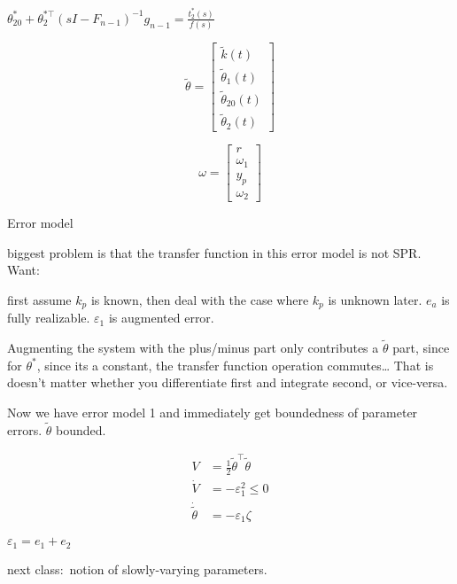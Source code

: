 $\theta_{20}^{*}+\theta_{2}^{*\top}(sI-F_{n-1})^{-1}g_{n-1}=\frac{t_{2}^{*}(s)}{f(s)}$

\begin{equation*}
  \tilde{\theta}=
  \begin{bmatrix}
    \tilde{k}(t) \\
    \tilde{\theta}_{1}(t) \\
    \tilde{\theta}_{20}(t) \\
    \tilde{\theta}_{2}(t)
  \end{bmatrix}
\end{equation*}

\begin{equation*}
  \omega=
  \begin{bmatrix}
    r \\
    \omega_{1} \\
    y_{p} \\
    \omega_{2}
  \end{bmatrix}
\end{equation*}

Error model


biggest problem is that the transfer function in this error model is not SPR.\@
Want:


first assume $k_{p}$ is known, then deal with the case where $k_{p}$ is unknown later.
$e_{a}$ is fully realizable.
$\varepsilon_{1}$ is augmented error.

Augmenting the system with the plus/minus part only contributes a $\tilde{\theta}$ part, since for $\theta^{*}$, since its a constant, the transfer function operation commutes\ldots
That is doesn't matter whether you differentiate first and integrate second, or vice-versa.

Now we have error model 1 and immediately get boundedness of parameter errors.
$\tilde{\theta}$ bounded.

\begin{align*}
  V&=\frac{1}{2}\tilde{\theta}^{\top}\tilde{\theta} \\
  \dot{V}&=-\varepsilon_{1}^{2}\leq0 \\
  \dot{\tilde{\theta}}&=-\varepsilon_{1}\zeta
\end{align*}

$\varepsilon_{1}=e_{1}+e_{2}$

next class:\ notion of slowly-varying parameters.


